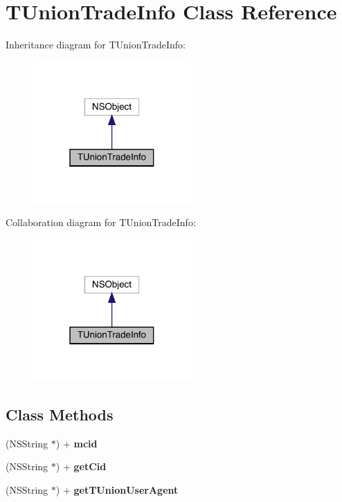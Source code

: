 \hypertarget{interface_t_union_trade_info}{}\section{T\+Union\+Trade\+Info Class Reference}
\label{interface_t_union_trade_info}


Inheritance diagram for T\+Union\+Trade\+Info\+:\nopagebreak
\begin{figure}[H]
\begin{center}
\leavevmode
\includegraphics[width=171pt]{interface_t_union_trade_info__inherit__graph}
\end{center}
\end{figure}


Collaboration diagram for T\+Union\+Trade\+Info\+:\nopagebreak
\begin{figure}[H]
\begin{center}
\leavevmode
\includegraphics[width=171pt]{interface_t_union_trade_info__coll__graph}
\end{center}
\end{figure}
\subsection*{Class Methods}
\begin{DoxyCompactItemize}
\item 
\mbox{\label{interface_t_union_trade_info_ac8b5937d75eb186f0d770e46ed5a0482}} 
(N\+S\+String $\ast$) + {\bfseries mcid}
\item 
\mbox{\label{interface_t_union_trade_info_a1eea700cfac334abfa4e219be35cdbf8}} 
(N\+S\+String $\ast$) + {\bfseries get\+Cid}
\item 
\mbox{\label{interface_t_union_trade_info_ab036319dd1539f3b072b569229bc2164}} 
(N\+S\+String $\ast$) + {\bfseries get\+T\+Union\+User\+Agent}
\end{DoxyCompactItemize}


